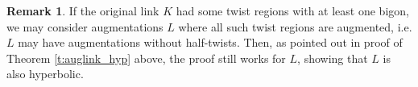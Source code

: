 \documentclass[11pt]{amsart}
\newcommand{\thmref}[1]{Theorem \ref{#1}}
\theoremstyle{plain}
\theoremstyle{definition}
\newtheorem{remark}[theorem]{Remark}
\begin{document}
\begin{remark}
\label{r:nohalftwist}
If the original link $K$ had some twist regions with at least one bigon,
we may consider augmentations $L$ where all such twist regions
are augmented, i.e. $L$ may have augmentations without half-twists.
Then, as pointed out in proof of \thmref{t:auglink_hyp} above,
the proof still works for $L$, showing that $L$ is also hyperbolic.
\end{remark}





\end{document}
